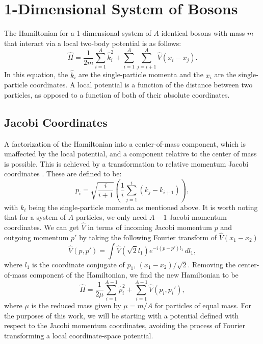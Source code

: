 \section{1-Dimensional System of Bosons}

The Hamiltonian for a 1-dimensional system of $A$ identical bosons with mass $m$ that interact via a local two-body potential is as follows:
\begin{equation}
\hat{H} = \frac{1}{2 m} \sum_{i=1}^A \hat{k}_i^2 + \sum_{i=1}^A\sum_{j=i+1}^{A} \hat{V}(x_i - x_j).
\end{equation}
In this equation, the $\hat{k}_i$ are the single-particle momenta and the $x_i$ are the single-particle coordinates. A local potential is a function of the distance between two particles, as opposed to a function of both of their absolute coordinates.

\subsection{Jacobi Coordinates}

A factorization of the Hamiltonian into a center-of-mass component, which is unaffected by the local potential, and a component relative to the center of mass is possible. This is achieved by a transformation to relative momentum Jacobi coordinates \cite{Jurgenson:2008jp}. These are defined to be:
\begin{equation}
p_i = \sqrt{\frac{i}{i+1}} \left(\frac{1}{i} \sum_{j=1}^{i}(k_j - k_{i+1})\right),
\end{equation}
with $k_i$ being the single-particle momenta as mentioned above. It is worth noting that for a system of $A$ particles, we only need $A-1$ Jacobi momentum coordinates. We can get $\hat{V}$ in terms of incoming Jacobi momentum $p$ and outgoing momentum $p'$ by taking the following Fourier transform of $\hat{V}(x_1 - x_2)$
\begin{equation}
\hat{V}(p, p') = \int \hat{V}(\sqrt{2} l_1) e^{- i (p - p') l_1} \,dl_1,
\end{equation}
where $l_1$ is the coordinate conjugate of $p_1$, $(x_1 - x_2)/\sqrt{2}$. Removing the center-of-mass component of the Hamiltonian, we find the new Hamiltonian to be
\begin{equation}
\hat{H} = \frac{1}{2 \mu} \sum_{i=1}^{A-1} \hat{p}_i^2 + \sum_{i=1}^{A-1}\hat{V}(p_i, p_i'),
\end{equation}
where $\mu$ is the reduced mass given by $\mu = m / A$ for particles of equal mass. For the purposes of this work, we will be starting with a potential defined with respect to the Jacobi momentum coordinates, avoiding the process of Fourier transforming a local coordinate-space potential.

